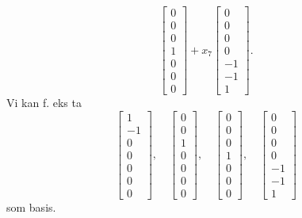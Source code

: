 \begin{losning}
\begin{punkt}
$$\begin{bmatrix}
0\\
0\\
0\\
1\\
0\\
0\\
0
\end{bmatrix}+x_7\begin{bmatrix}
0\\
0\\
0\\
0\\
-1\\
-1\\
1
\end{bmatrix}.$$ Vi kan f. eks ta $$\begin{bmatrix}
1\\
-1\\
0\\
0\\
0\\
0\\
0
\end{bmatrix},\quad \begin{bmatrix}
0\\
0\\
1\\
0\\
0\\
0\\
0
\end{bmatrix}, \quad \begin{bmatrix}
0\\
0\\
0\\
1\\
0\\
0\\
0
\end{bmatrix}, \quad \begin{bmatrix}
0\\
0\\
0\\
0\\
-1\\
-1\\
1
\end{bmatrix}$$ som basis.


\end{punkt}
\end{losning}
